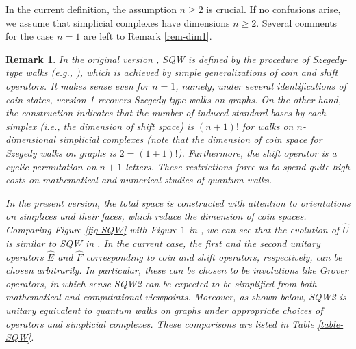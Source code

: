 \documentclass[a4paper,12pt]{article}
\newtheorem{remark}[definition]{Remark}
\numberwithin{equation}{section}
\begin{document}
In the current definition, the assumption $n\geq 2$ is crucial.
If no confusions arise, we assume that simplicial complexes have dimensions $n\geq 2$.
Several comments for the case $n=1$ are left to Remark \ref{rem-dim1}.
\begin{remark}\rm
\label{rem-comparison}
In the original version \cite{MOSver1}, SQW is defined by the procedure of Szegedy-type walks (e.g., \cite{HKSS2}), which is achieved by simple generalizations of coin and shift operators.
It makes sense even for $n=1$, namely, under several identifications of coin states, version 1 recovers Szegedy-type walks on graphs.
On the other hand, the construction indicates that the number of induced standard bases by each simplex (i.e., the dimension of {\it shift} space) is $(n+1)!$ for walks on $n$-dimensional simplicial complexes (note that the dimension of coin space for Szegedy walks on graphs is $2 = (1+1)!$).
Furthermore, the shift operator is a cyclic permutation on $n+1$ letters. %
These restrictions force us to spend quite high costs on mathematical and numerical studies of quantum walks.
\par
In the present version, the total space is constructed with attention to {\em orientations} on simplices and their faces, which reduce the dimension of coin spaces.
Comparing Figure \ref{fig-SQW} with Figure $1$ in \cite{MOSver1}, we can see that the evolution of $\hat U$ is similar to SQW in \cite{MOSver1}.
In the current case, the first and the second unitary operators $\hat E$ and $\hat F$ corresponding to coin and shift operators, respectively, can be chosen arbitrarily. 
In particular, these can be chosen to be involutions like Grover operators, in which sense SQW2 can be expected to be simplified from both mathematical and computational viewpoints.
Moreover, as shown below, SQW2 is unitary equivalent to quantum walks on graphs under appropriate choices of operators and simplicial complexes. 
%
These comparisons are listed in Table \ref{table-SQW}.
\end{remark}
\end{document}
